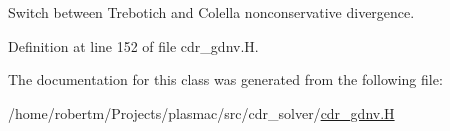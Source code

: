 Switch between Trebotich and Colella nonconservative divergence. 



Definition at line 152 of file cdr\+\_\+gdnv.\+H.



The documentation for this class was generated from the following file\+:\begin{DoxyCompactItemize}
\item 
/home/robertm/\+Projects/plasmac/src/cdr\+\_\+solver/\hyperlink{cdr__gdnv_8H}{cdr\+\_\+gdnv.\+H}\end{DoxyCompactItemize}

